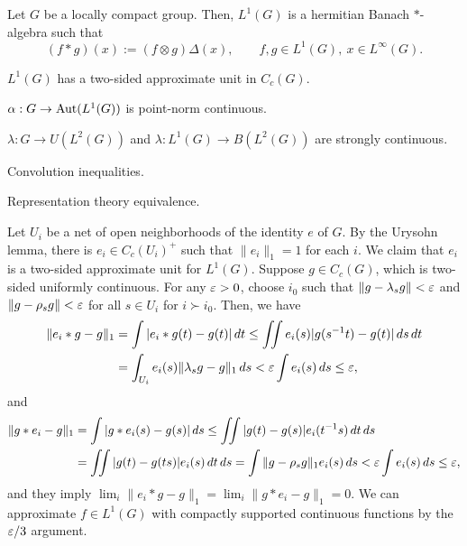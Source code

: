\documentclass{../../large}
\begin{document}
\begin{prb}
Let $G$ be a locally compact group.
Then, $L^1(G)$ is a hermitian Banach $*$-algebra such that
\[(f*g)(x):=(f\otimes g)\Delta(x),\qquad f,g\in L^1(G),\ x\in L^\infty(G).\]
\begin{parts}
\item $L^1(G)$ has a two-sided approximate unit in $C_c(G)$.
\item $\alpha:G\to\operatorname{Aut}(L^1(G))$ is point-norm continuous.
\item $\lambda:G\to U(L^2(G))$ and $\lambda:L^1(G)\to B(L^2(G))$ are strongly continuous.
\item Convolution inequalities.
\item Representation theory equivalence.
\end{parts}
\begin{pf}
Let $U_i$ be a net of open neighborhoods of the identity $e$ of $G$.
By the Urysohn lemma, there is $e_i\in C_c(U_i)^+$ such that $\|e_i\|_1=1$ for each $i$.
We claim that $e_i$ is a two-sided approximate unit for $L^1(G)$.
Suppose $g\in C_c(G)$, which is two-sided uniformly continuous.
For any $\varepsilon>0$, choose $i_0$ such that $\|g-\lambda_sg\|<\varepsilon$ and $\|g-\rho_sg\|<\varepsilon$ for all $s\in U_i$ for $i\succ i_0$.
Then, we have
\begin{align*}
\|e_i*g-g\|_1
&=\int|e_i*g(t)-g(t)|\,dt
\le\iint e_i(s)|g(s^{-1}t)-g(t)|\,ds\,dt\\
&=\int_{U_i}e_i(s)\|\lambda_sg-g\|_1\,ds
<\varepsilon\int e_i(s)\,ds\le\varepsilon,
\end{align*}
and
\begin{align*}
\|g*e_i-g\|_1
&=\int|g*e_i(s)-g(s)|\,ds
\le\iint|g(t)-g(s)|e_i(t^{-1}s)\,dt\,ds\\
&=\iint|g(t)-g(ts)|e_i(s)\,dt\,ds
=\int\|g-\rho_sg\|_1e_i(s)\,ds
<\varepsilon\int e_i(s)\,ds\le\varepsilon,
\end{align*}
and they imply $\lim_i\|e_i*g-g\|_1=\lim_i\|g*e_i-g\|_1=0$.
We can approximate $f\in L^1(G)$ with compactly supported continuous functions by the $\varepsilon/3$ argument.
\end{pf}

\end{prb}


\begin{prb}
\end{prb}

\begin{prb}
\end{prb}
\end{document}
